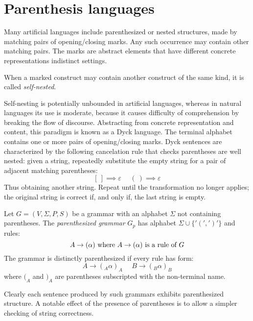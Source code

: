 \section{Parenthesis languages}

Many  artificial  languages  include  parenthesized  or  nested  structures,  made  by matching pairs of opening/closing marks. Any such occurrence may contain other matching pairs.
The marks are abstract elements that have different concrete representations indistinct settings.
\begin{definition}
    When a marked construct may contain another construct of the same kind, it is called \emph{self-nested}.
\end{definition}
Self-nesting is potentially unbounded in artificial languages, whereas in natural languages its use is moderate, because it causes difficulty of comprehension by breaking the flow of discourse. 
Abstracting from concrete representation and content, this paradigm is known as a Dyck language. The terminal alphabet contains one or more pairs of opening/closing marks. 
Dyck sentences are characterized by the following cancelation rule that checks parentheses are well nested: given a string, repeatedly substitute the empty string for a pair of adjacent matching parentheses:
\[[\:]\implies\varepsilon \:\:\:\:\:\: (\:)\implies\varepsilon\]
Thus obtaining another string. Repeat until the transformation no longer applies; the original string is correct if, and only if, the last string is empty.
\begin{definition}
    Let $G=(V,\Sigma,P,S)$ be a grammar with an alphabet $\Sigma$ not containing parentheses. The \emph{parenthesized grammar} $G_p$ has alphabet $\Sigma \cup \{'(',')'\}$ and rules:
    \[A \rightarrow (\alpha) \textnormal{ where } A \rightarrow (\alpha) \textnormal{ is a rule of } G\]
    The grammar is distinctly parenthesized if every rule has form:
    \[A \rightarrow (_A \alpha)_A \:\:\:\:\:\: B \rightarrow (_B \alpha)_B\]
    where $(_A$ and $)_A$ are parentheses subscripted with the non-terminal name.
\end{definition}
Clearly each sentence produced by such grammars exhibits parenthesized structure. A notable effect of the presence of parentheses is to allow a simpler checking of string correctness. 